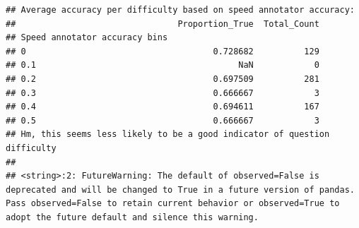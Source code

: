 \documentclass[
]{article}
\begin{document}
\begin{verbatim}
## Average accuracy per difficulty based on speed annotator accuracy:
##                                Proportion_True  Total_Count
## Speed annotator accuracy bins                              
## 0                                     0.728682          129
## 0.1                                        NaN            0
## 0.2                                   0.697509          281
## 0.3                                   0.666667            3
## 0.4                                   0.694611          167
## 0.5                                   0.666667            3
## Hm, this seems less likely to be a good indicator of question difficulty
## 
## <string>:2: FutureWarning: The default of observed=False is deprecated and will be changed to True in a future version of pandas. Pass observed=False to retain current behavior or observed=True to adopt the future default and silence this warning.
\end{verbatim}
\end{document}
